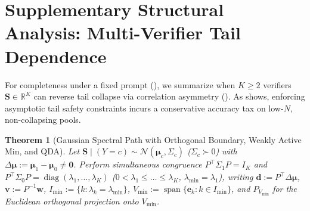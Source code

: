 \documentclass[10pt]{article}
\theoremstyle{plain}
\newtheorem{theorem}{Theorem}
\theoremstyle{definition}
\theoremstyle{remark}
\newcommand{\R}{\mathbb{R}}
\begin{document}
\section{Supplementary Structural Analysis: Multi-Verifier Tail Dependence}
\label{sec:ensemble}

For completeness under a fixed prompt (), we summarize when $K \ge 2$ verifiers $\mathbf{S} \in \R^K$ can reverse tail collapse via correlation asymmetry \citep{coste2024reward,rame2024warm} (). As  shows, enforcing asymptotic tail safety constraints incurs a conservative accuracy tax on low-$N$, non-collapsing pools.

\begin{theorem}[Gaussian Spectral Path with Orthogonal Boundary, Weakly Active $\mathrm{Min}$, and QDA]
\label{thm:gaussian-ensemble}
Let $\mathbf{S} \mid (Y = c) \sim \mathcal{N}(\boldsymbol{\mu}_c, \Sigma_c)$ ($\Sigma_c \succ 0$) with $\Delta\boldsymbol{\mu} := \boldsymbol{\mu}_1 - \boldsymbol{\mu}_0 \neq \mathbf{0}$. Perform simultaneous congruence $P^\top\Sigma_1 P = I_K$ and $P^\top\Sigma_0 P = \operatorname{diag}(\lambda_1,\dots,\lambda_K)$ ($0 < \lambda_1 \le \dots \le \lambda_K$, $\lambda_{\min} = \lambda_1$), writing $\mathbf{d} := P^\top\Delta\boldsymbol{\mu}$, $\mathbf{v} := P^{-1}\mathbf{w}$, $I_{\min} := \{k : \lambda_k = \lambda_{\min}\}$, $V_{\min} := \operatorname{span}\{\mathbf{e}_k : k \in I_{\min}\}$, and $P_{V_{\min}}$ for the Euclidean orthogonal projection onto $V_{\min}$.
\begin{enumerate}[leftmargin=1.6em,itemsep=2pt,topsep=1pt]

\end{enumerate}
\end{theorem}
\end{document}
